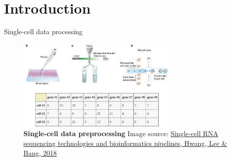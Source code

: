 \section{Introduction}

\begin{frame}{Single-cell data processing}
\begin{figure}
    \includegraphics[width=0.7\textwidth]{images/data_proc.png}
    \caption{\textbf{Single-cell data preprocessing} Image source: \href{https://www.nature.com/articles/s12276-018-0071-8}{Single-cell RNA sequencing technologies and bioinformatics pipelines, Hwang, Lee \& Bang, 2018}}
\end{figure}
    
\end{frame}
